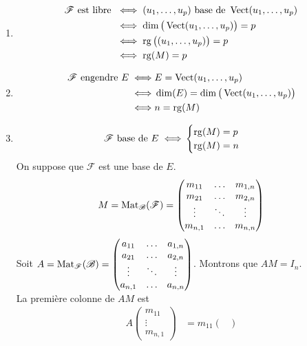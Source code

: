 \begin{prv}
	\begin{enumerate}
		\item 
			\begin{align*}
				\mathcal{F} \text{ est libre } &\iff (u_1, \ldots, u_p) \text{ base de } \operatorname{Vect}(u_1, \ldots, u_p)\\
				&\iff \dim\big(\operatorname{Vect}(u_1, \ldots, u_p)\big) = p\\
				&\iff \operatorname{rg}\big((u_1, \ldots, u_p)\big) = p\\
				&\iff \operatorname{rg}(M) = p
			\end{align*}
		\item
			\begin{align*}
				\mathcal{F} \text{ engendre } E \iff& E = \operatorname{Vect}(u_1, \ldots, u_p)\\
				\iff& \dim(E) = \dim\big(\operatorname{Vect}(u_1, \ldots, u_p)\big)\\
				\iff& n = \operatorname{rg}(M)
			\end{align*}
		\item
			\begin{align*}
				\mathcal{F} \text{ base de } E \iff& \begin{cases}
					\operatorname{rg}(M) = p\\
					\operatorname{rg}(M) = n
				\end{cases}
			\end{align*}
			On suppose que $\mathcal{F}$ est une base de $E$. \[
				M = \operatorname{Mat}_{\mathcal{B}}(\mathcal{F}) = \begin{pmatrix}
					m_{11}& \ldots & m_{1,n}\\
					m_{21}&\ldots&m_{2,n}\\
					\vdots&\ddots&\vdots\\
					m_{n,1}&\ldots&m_{n,n}
				\end{pmatrix}
			\]
			Soit $A = \operatorname{Mat}_{\mathcal{F}}(\mathcal{B}) = \begin{pmatrix}
				a_{11}& \ldots & a_{1,n}\\
				a_{21}&\ldots&a_{2,n}\\
				\vdots&\ddots&\vdots\\
				a_{n,1}&\ldots&a_{n,n}
			\end{pmatrix}$. Montrons que $AM = I_n$.\\
			La première colonne de $AM$ est 
			\begin{align*}
				A \begin{pmatrix}
					m_{11}\\
					\vdots\\
					m_{n,1}
				\end{pmatrix} &=  m_{11} \begin{pmatrix}

\end{pmatrix}
\end{align*}
\end{enumerate}
\end{prv}

